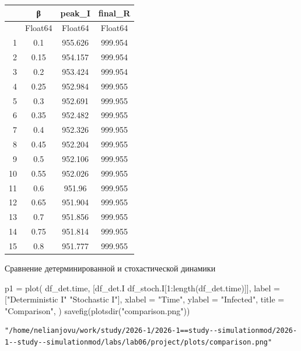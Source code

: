 \documentclass[
  12pt,
  a4paper,
  DIV=11,
  numbers=noendperiod]{scrreprt}
\newenvironment{Shaded}{\begin{snugshade}}{\end{snugshade}}
\newcommand{\FloatTok}[1]{\textcolor[rgb]{0.68,0.00,0.00}{#1}}
\newcommand{\FunctionTok}[1]{\textcolor[rgb]{0.28,0.35,0.67}{#1}}
\newcommand{\NormalTok}[1]{\textcolor[rgb]{0.00,0.23,0.31}{#1}}
\newcommand{\OperatorTok}[1]{\textcolor[rgb]{0.37,0.37,0.37}{#1}}
\newcommand{\StringTok}[1]{\textcolor[rgb]{0.13,0.47,0.30}{#1}}
\begin{document}
\begin{tabular}{r|ccc}
    & β & peak\_I & final\_R\\
    \hline
    & Float64 & Float64 & Float64\\
    \hline
    1 & 0.1 & 955.626 & 999.954 \\
    2 & 0.15 & 954.157 & 999.954 \\
    3 & 0.2 & 953.424 & 999.954 \\
    4 & 0.25 & 952.984 & 999.955 \\
    5 & 0.3 & 952.691 & 999.955 \\
    6 & 0.35 & 952.482 & 999.955 \\
    7 & 0.4 & 952.326 & 999.955 \\
    8 & 0.45 & 952.204 & 999.955 \\
    9 & 0.5 & 952.106 & 999.955 \\
    10 & 0.55 & 952.026 & 999.955 \\
    11 & 0.6 & 951.96 & 999.955 \\
    12 & 0.65 & 951.904 & 999.955 \\
    13 & 0.7 & 951.856 & 999.955 \\
    14 & 0.75 & 951.814 & 999.955 \\
    15 & 0.8 & 951.777 & 999.955 \\
\end{tabular}

Сравнение детерминированной и стохастической динамики

\begin{Shaded}
\begin{Highlighting}[]
\NormalTok{p1 }\OperatorTok{=} \FunctionTok{plot}\NormalTok{(}
\NormalTok{    df\_det.time,}
\NormalTok{    [df\_det.I df\_stoch.I[}\FloatTok{1}\OperatorTok{:}\FunctionTok{length}\NormalTok{(df\_det.time)]],}
\NormalTok{    label }\OperatorTok{=}\NormalTok{ [}\StringTok{"Deterministic I"} \StringTok{"Stochastic I"}\NormalTok{],}
\NormalTok{    xlabel }\OperatorTok{=} \StringTok{"Time"}\NormalTok{,}
\NormalTok{    ylabel }\OperatorTok{=} \StringTok{"Infected"}\NormalTok{,}
\NormalTok{    title }\OperatorTok{=} \StringTok{"Comparison"}\NormalTok{,}
\NormalTok{    )}
\FunctionTok{savefig}\NormalTok{(}\FunctionTok{plotsdir}\NormalTok{(}\StringTok{"comparison.png"}\NormalTok{))}
\end{Highlighting}
\end{Shaded}

\begin{verbatim}
"/home/nelianjovu/work/study/2026-1/2026-1==study--simulationmod/2026-1--study--simulationmod/labs/lab06/project/plots/comparison.png"
\end{verbatim}
\end{document}
